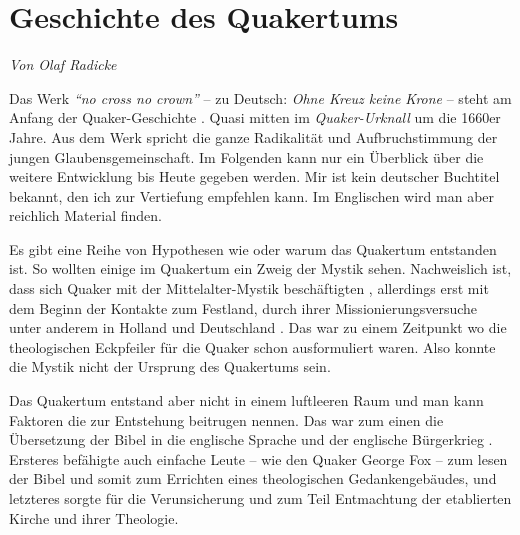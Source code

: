 




\chapter{Geschichte des Quakertums}\label{ref:entwicklung_quakertum}


\begin{flushright}
\begin{footnotesize}
\textit{Von Olaf Radicke}
\end{footnotesize}
\end{flushright}
\smallskip 

Das Werk \textit{"`no cross no crown"'} -- zu Deutsch: \textit{Ohne Kreuz keine
Krone} --
steht am Anfang der Quaker-Geschichte . Quasi mitten im
\textit{Quaker-Urknall}
um die 1660er Jahre. Aus dem Werk spricht die ganze Radikalität und
Aufbruchstimmung der jungen Glaubensgemeinschaft. Im Folgenden kann nur ein
Überblick über die weitere Entwicklung bis Heute gegeben werden. Mir ist kein
deutscher Buchtitel bekannt, den ich zur Vertiefung empfehlen kann. Im
Englischen wird man aber reichlich Material finden.

\medskip

Es gibt eine Reihe von Hypothesen wie oder warum das Quakertum
entstanden ist.
So
wollten einige im Quakertum ein Zweig der Mystik  sehen.
Nachweislich ist, dass
sich Quaker mit der Mittelalter-Mystik beschäftigten , allerdings erst mit dem
Beginn der Kontakte zum Festland, durch ihrer Missionierungsversuche
 unter
anderem in Holland  und Deutschland
. Das war zu einem Zeitpunkt wo die
theologischen Eckpfeiler für die Quaker schon ausformuliert waren. Also konnte
die Mystik nicht der Ursprung des Quakertums sein.

\medskip

Das Quakertum entstand aber nicht in einem luftleeren Raum und man kann Faktoren
die zur Entstehung beitrugen nennen. Das war zum einen die Übersetzung der Bibel
in die englische Sprache und der englische Bürgerkrieg
. Ersteres befähigte auch
einfache Leute -- wie den Quaker George Fox  -- zum
lesen der Bibel und somit zum
Errichten eines theologischen Gedankengebäudes, und letzteres sorgte für die
Verunsicherung und zum Teil Entmachtung der etablierten Kirche
 und ihrer
Theologie.

